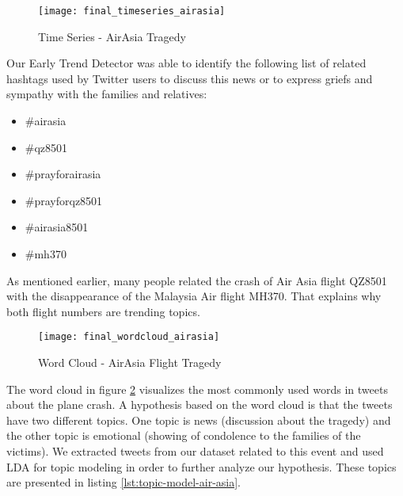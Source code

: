 \begin{figure}[H]
  \centering
        \texttt{[image: final\_timeseries\_airasia]}
  \caption[Time Series - AirAsia Tragedy]{Time Series - AirAsia Tragedy}
  \label{fig:air-asia-time-series}
  \vspace{-1.3em}
\end{figure}

Our Early Trend Detector was able to identify the following list of related hashtags used by Twitter users to discuss this news or to express griefs and sympathy with the families and relatives:

\begin{multicols}{2}
\begin{itemize}[label={}]
	\item \#airasia
	\item \#qz8501
    \item \#prayforairasia
    \item \#prayforqz8501
    \item \#airasia8501
    \item \#mh370
\end{itemize}
\end{multicols}

As mentioned earlier, many people related the crash of Air Asia flight QZ8501 with the disappearance of the Malaysia Air flight MH370. That explains why both flight numbers are trending topics.

\begin{figure}[H]
  \centering
        \texttt{[image: final\_wordcloud\_airasia]}
  \caption[Word Cloud - AirAsia Tragedy]{Word Cloud - AirAsia Flight Tragedy}
  \label{fig:air-asia-flight-tragedy-word-cloud}
  \vspace{-1.3em}
\end{figure}

The word cloud in figure \ref{fig:air-asia-flight-tragedy-word-cloud} visualizes the most commonly used words in tweets about the plane crash. A hypothesis based on the word cloud is that the tweets have two different topics. One topic is news (discussion about the tragedy) and the other topic is emotional (showing of condolence to the families of the victims).
We extracted tweets from our dataset related to this event and used LDA for topic modeling in order to further analyze our hypothesis. These topics are presented in listing \ref{lst:topic-model-air-asia}.

